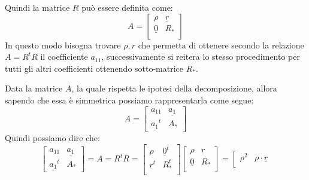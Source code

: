 \begin{dimostrazione}
    Quindi la matrice $R$ può essere definita come:
    \begin{equation*}
        A=\left[\begin{array}{c|c}
                \rho          & \underline{r} \\
                \hline
                \underline{0} & R_\ast        \\
            \end{array}\right]
    \end{equation*}
    In questo modo bisogna trovare $\rho, r$ che permetta di ottenere secondo la
    relazione $A = R^tR$ il coefficiente $a_{11}$, successivamente si reitera lo
    stesso procedimento per tutti gli altri coefficienti ottenendo sotto-matrice
    $R_\ast$.

    Data la matrice $A$, la quale rispetta le ipotesi della decomposizione, allora
    sapendo che essa è simmetrica possiamo rappresentarla come segue:
    \begin{equation*}
        A=\left[\begin{array}{c|ccc}
                a_{11}            & \underline{a_1} \\
                \hline
                \underline{a_1}^t & A_\ast
            \end{array}\right]
    \end{equation*}
    Quindi possiamo dire che:
    \begin{equation*}
        \left[\begin{array}{c|ccc}
                a_{11}            & \underline{a_1} \\
                \hline
                \underline{a_1}^t & A_\ast
            \end{array}\right] = A = R^tR= \left[\begin{array}{c|c}
                \rho            & \underline{0}^t \\
                \hline
                \underline{r}^t & R_\ast^t        \\
            \end{array}\right]\left[\begin{array}{c|c}
                \rho          & \underline{r} \\
                \hline
                \underline{0} & R_\ast        \\
            \end{array}\right]=\left[\begin{array}{c|c}
                \rho^2                   & \rho \cdot\underline{r}                      \\

\end{array}
\end{equation*}
\end{dimostrazione}
